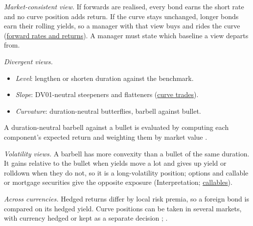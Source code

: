 \begin{qfmethod}\label{meth:yield-curve-positioning}
 \emph{Market-consistent view.} If forwards are realised, every bond earns the short rate and no curve position adds return. If the curve stays unchanged, longer bonds earn their rolling yields, so a manager with that view buys and rides the curve (\hyperref[meth:forward-rates-expected-returns]{forward rates and returns}). A manager must state which baseline a view departs from.

\emph{Divergent views.}
\begin{itemize}
\item \emph{Level}: lengthen or shorten duration against the benchmark.
\item \emph{Slope}: DV01-neutral steepeners and flatteners (\hyperref[meth:curve-trades-carry-rolldown]{curve trades}).
\item \emph{Curvature}: duration-neutral butterflies, barbell against bullet.
\end{itemize}
A duration-neutral barbell against a bullet is evaluated by computing each component's expected return and weighting them by market value \citep[chap.~32, p.~724]{s7-fabozzifixed}.

\emph{Volatility views.} A barbell has more convexity than a bullet of the same duration. It gains relative to the bullet when yields move a lot and gives up yield or rolldown when they do not, so it is a long-volatility position; options and callable or mortgage securities give the opposite exposure (Interpretation; \hyperref[meth:callable-putable-bond-valuation]{callables}).

\emph{Across currencies.} Hedged returns differ by local risk premia, so a foreign bond is compared on its hedged yield. Curve positions can be taken in several markets, with currency hedged or kept as a separate decision \citep[chap.~6, sec.~6.2, pp.~393--396]{managing-investment-portfolios-2007}; \citep[chap.~57, pp.~1418--1425]{s7-fabozzifixed}.


\end{qfmethod}
